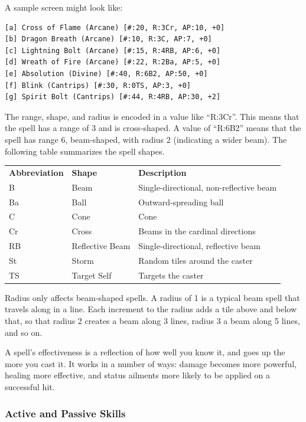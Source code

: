 A sample screen might look like:

\begin{verbatim}
[a] Cross of Flame (Arcane) [#:20, R:3Cr, AP:10, +0]
[b] Dragon Breath (Arcane) [#:10, R:3C, AP:7, +0]
[c] Lightning Bolt (Arcane) [#:15, R:4RB, AP:6, +0]
[d] Wreath of Fire (Arcane) [#:22, R:2Ba, AP:5, +0]
[e] Absolution (Divine) [#:40, R:6B2, AP:50, +0]
[f] Blink (Cantrips) [#:30, R:0TS, AP:3, +0]
[g] Spirit Bolt (Cantrips) [#:44, R:4RB, AP:30, +2]
\end{verbatim}

The range, shape, and radius is encoded in a value like ``R:3Cr''.  This
means that the spell has a range of 3 and is cross-shaped.  A value of
``R:6B2'' means that the spell has range 6, beam-shaped, with radius 2
(indicating a wider beam).  The following table summarizes the spell
shapes.

\begin{table}[h]
\begin{tabular}{lll}
{\bf Abbreviation} & {\bf Shape} & {\bf Description} \\
B & Beam & Single-directional, non-reflective beam \\
Ba & Ball & Outward-spreading ball \\
C & Cone & Cone \\
Cr & Cross & Beams in the cardinal directions \\
RB & Reflective Beam & Single-directional, reflective beam \\
St & Storm & Random tiles around the caster \\
TS & Target Self & Targets the caster \\
\end{tabular}
\end{table}

Radius only affects beam-shaped spells.  A radius of 1 is a typical
beam spell that travels along in a line.  Each increment to the radius
adds a tile above and below that, so that radius 2 creates a beam along
3 lines, radius 3 a beam along 5 lines, and so on.

A spell's effectiveness is a reflection of how well you know it, and goes
up the more you cast it.  It works in a number of ways: damage becomes more
powerful, healing more effective, and status ailments more likely to be
applied on a successful hit.

\subsubsection{Active and Passive Skills}

